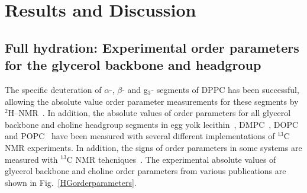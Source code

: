 \documentclass[pre,aps,floatfix,authordate1-4,twocolumn]{revtex4-1}
\begin{document}

 





\section{Results and Discussion}

\subsection{Full hydration: Experimental order parameters for the glycerol backbone and headgroup}\label{experiments}
The specific deuteration of $\alpha$-, $\beta$- and g$_3$- segments of DPPC has been successful, 
allowing the absolute value order parameter measurements for these segments by $^2$H--NMR~\cite{gally75,brown77,brown78,akutsu81}.
In addition, the absolute values of order parameters for all glycerol backbone and choline headgroup segments in egg yolk lecithin~\cite{hong95a},
DMPC~\cite{hong95b,gross97,dvinskikh05a}, DOPC~\cite{warschawski05} and POPC~\cite{warschawski05,ferreira13}
have been measured with several different implementations of $^{13}$C NMR experiments. In addition, the signs of order parameters in some systems
are measured with $^{13}$C NMR tehcniques~\cite{hong95a,hong95b,gross97}. The experimental absolute values of glycerol backbone 
and choline order parameters from various publications are shown in Fig.~\ref{HGorderparameters}.
\end{document}
